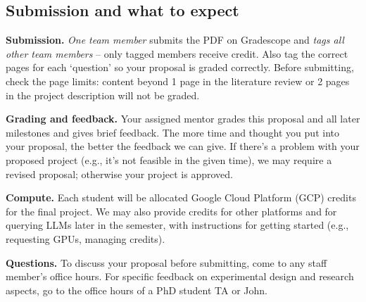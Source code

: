 \documentclass{article}
\begin{document}
\begin{instructions}
\section*{Submission and what to expect}
\textbf{Submission.} \textit{One team member} submits the PDF on Gradescope and \textit{tags all other team members} -- only tagged members receive credit. Also tag the correct pages for each `question' so your proposal is graded correctly. Before submitting, check the page limits: content beyond 1 page in the literature review or 2 pages in the project description will not be graded.

\textbf{Grading and feedback.} Your assigned mentor grades this proposal and all later milestones and gives brief feedback. The more time and thought you put into your proposal, the better the feedback we can give. If there's a problem with your proposed project (e.g., it's not feasible in the given time), we may require a revised proposal; otherwise your project is approved.

\textbf{Compute.} Each student will be allocated Google Cloud Platform (GCP) credits for the final project. We may also provide credits for other platforms and for querying LLMs later in the semester, with instructions for getting started (e.g., requesting GPUs, managing credits).

\textbf{Questions.} To discuss your proposal before submitting, come to any staff member's office hours. For specific feedback on experimental design and research aspects, go to the office hours of a PhD student TA or John.
\end{instructions}
\end{document}
